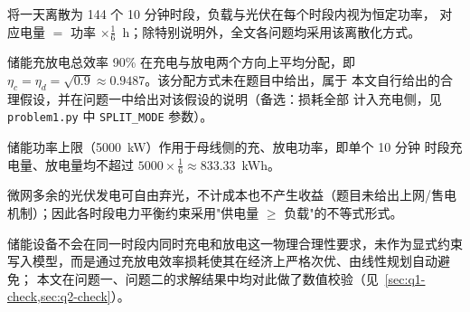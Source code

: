 \documentclass[withoutpreface,bwprint]{cumcmthesis}
\begin{document}
\begin{assumption}
将一天离散为 144 个 10 分钟时段，负载与光伏在每个时段内视为恒定功率，
对应电量 $=$ 功率 $\times\frac16$~h；除特别说明外，全文各问题均采用该离散化方式。
\label{asu:discretization}
\end{assumption}

\begin{assumption}
储能充放电总效率 90\% 在充电与放电两个方向上平均分配，即
$\eta_c=\eta_d=\sqrt{0.9}\approx0.9487$。该分配方式未在题目中给出，属于
本文自行给出的合理假设，并在问题一中给出对该假设的说明（备选：损耗全部
计入充电侧，见 \texttt{problem1.py} 中 \texttt{SPLIT\_MODE} 参数）。
\label{asu:efficiency}
\end{assumption}

\begin{assumption}
储能功率上限（\num{5000}~kW）作用于母线侧的充、放电功率，即单个 10 分钟
时段充电量、放电量均不超过 $5000\times\frac16\approx833.33$~kWh。
\label{asu:power-limit}
\end{assumption}

\begin{assumption}
微网多余的光伏发电可自由弃光，不计成本也不产生收益（题目未给出上网/售电
机制）；因此各时段电力平衡约束采用"供电量 $\ge$ 负载"的不等式形式。
\label{asu:curtailment}
\end{assumption}

\begin{assumption}
储能设备不会在同一时段内同时充电和放电这一物理合理性要求，未作为显式约束
写入模型，而是通过充放电效率损耗使其在经济上严格次优、由线性规划自动避免；
本文在问题一、问题二的求解结果中均对此做了数值校验（见~\cref{sec:q1-check,sec:q2-check}）。
\label{asu:no-simultaneous}
\end{assumption}
\end{document}
